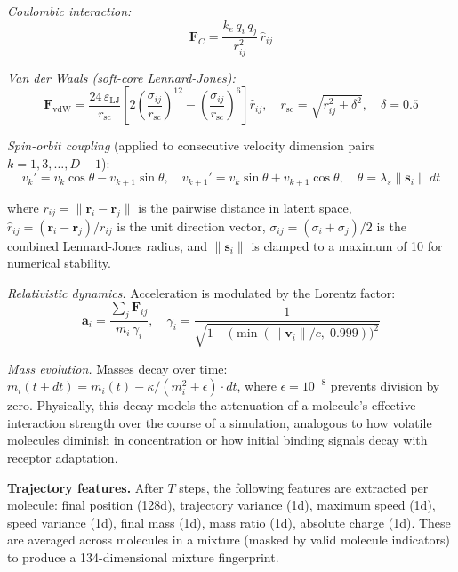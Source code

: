 \documentclass[11pt,a4paper]{article}
\begin{document}
\emph{Coulombic interaction:}
\begin{equation}
\mathbf{F}_{C} = \frac{k_e \, q_i \, q_j}{r_{ij}^2} \, \hat{r}_{ij}
\end{equation}

\emph{Van der Waals (soft-core Lennard-Jones):}
\begin{equation}
\mathbf{F}_{\text{vdW}} = \frac{24\,\varepsilon_{\text{LJ}}}{r_{\text{sc}}} \left[2\!\left(\frac{\sigma_{ij}}{r_{\text{sc}}}\right)^{\!12} - \left(\frac{\sigma_{ij}}{r_{\text{sc}}}\right)^{\!6}\right] \hat{r}_{ij}, \quad r_{\text{sc}} = \sqrt{r_{ij}^2 + \delta^2}, \quad \delta = 0.5
\end{equation}

\emph{Spin-orbit coupling} (applied to consecutive velocity dimension pairs $k = 1, 3, \ldots, D{-}1$):
\begin{equation}
v_k' = v_k \cos\theta - v_{k+1} \sin\theta, \quad v_{k+1}' = v_k \sin\theta + v_{k+1} \cos\theta, \quad \theta = \lambda_s \|\mathbf{s}_i\| \, dt
\end{equation}

where $r_{ij} = \|\mathbf{r}_i - \mathbf{r}_j\|$ is the pairwise distance in latent space, $\hat{r}_{ij} = (\mathbf{r}_i - \mathbf{r}_j) / r_{ij}$ is the unit direction vector, $\sigma_{ij} = (\sigma_i + \sigma_j)/2$ is the combined Lennard-Jones radius, and $\|\mathbf{s}_i\|$ is clamped to a maximum of 10 for numerical stability.

\emph{Relativistic dynamics.} Acceleration is modulated by the Lorentz factor:
\begin{equation}
\mathbf{a}_i = \frac{\sum_j \mathbf{F}_{ij}}{m_i \, \gamma_i}, \quad \gamma_i = \frac{1}{\sqrt{1 - \bigl(\min(\|\mathbf{v}_i\|/c,\; 0.999)\bigr)^2}}
\end{equation}

\emph{Mass evolution.} Masses decay over time: $m_i(t + dt) = m_i(t) - \kappa / (m_i^2 + \epsilon) \cdot dt$, where $\epsilon = 10^{-8}$ prevents division by zero. Physically, this decay models the attenuation of a molecule's effective interaction strength over the course of a simulation, analogous to how volatile molecules diminish in concentration or how initial binding signals decay with receptor adaptation.

\textbf{Trajectory features.} After $T$ steps, the following features are extracted per molecule: final position (128d), trajectory variance (1d), maximum speed (1d), speed variance (1d), final mass (1d), mass ratio (1d), absolute charge (1d). These are averaged across molecules in a mixture (masked by valid molecule indicators) to produce a 134-dimensional mixture fingerprint.
\end{document}
